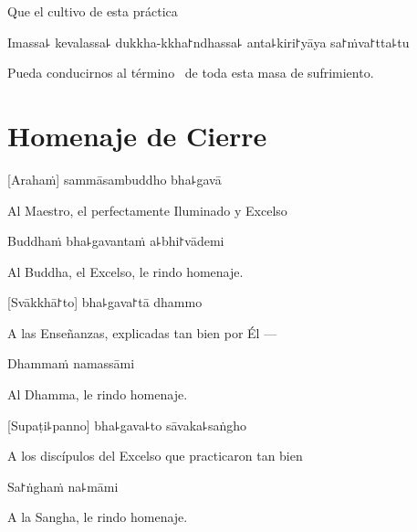 \begin{english}
  Que el cultivo de esta práctica
\end{english}

Imassa꜕ kevalassa꜕ dukkha-kkha꜓ndhassa꜕ anta꜕kiri꜓yāya sa꜓ṁva꜓tta꜕tu

\begin{english}
 Pueda conducirnos al término \pause\ de toda esta masa de sufrimiento.
\end{english}

\clearpage

\chapter{Homenaje de Cierre}

[Arahaṁ] sammāsambuddho bha꜕gavā

\begin{english}
  Al Maestro, el perfectamente Iluminado y Excelso 
\end{english}

Buddhaṁ bha꜕gavantaṁ a꜕bhi꜓vādemi

\begin{english}
  Al Buddha, el Excelso, le rindo homenaje.
\end{english}

[Svākkhā꜓to] bha꜕gava꜓tā dhammo

\begin{english}
  A las Enseñanzas, explicadas tan bien por Él ---
\end{english}

Dhammaṁ namassāmi

\begin{english}
  Al Dhamma, le rindo homenaje.
\end{english}


[Supaṭi꜕panno] bha꜕gava꜕to sāvaka꜕saṅgho

\begin{english}
  A los discípulos del Excelso que practicaron tan bien
\end{english}

Sa꜓ṅghaṁ na꜕māmi

\begin{english}
  A la Sangha, le rindo homenaje.
\end{english}
